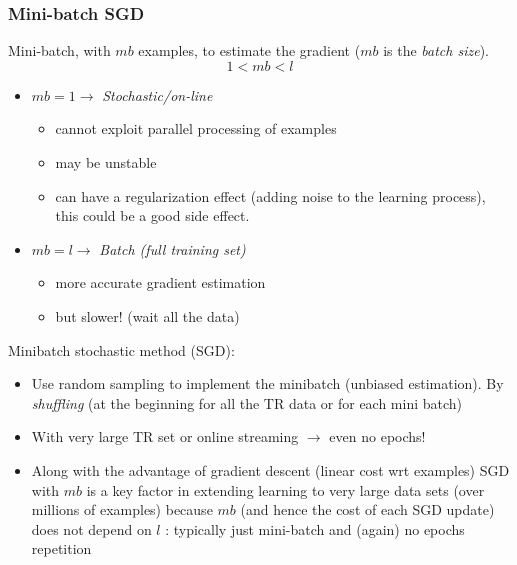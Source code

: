 \documentclass[../main.tex]{subfiles}
\begin{document}
\subsubsection{Mini-batch SGD}
Mini-batch, with $mb$ examples, to estimate the gradient ($mb$ is the \emph{batch size}).
$$1 < mb < l$$
\begin{itemize}
    \item $mb = 1 \rightarrow$ \emph{Stochastic/on-line}
    \begin{itemize}
        \item cannot exploit parallel processing of examples
        \item may be unstable
        \item can have a regularization effect (adding noise to the learning process), this could be a good side effect.
    \end{itemize}
    \item $mb = l \rightarrow$ \emph{Batch (full training set)}
    \begin{itemize}
        \item more accurate gradient estimation
        \item but slower! (wait all the data)
    \end{itemize}
\end{itemize}
Minibatch stochastic method (SGD):
\begin{itemize}
    \item Use random sampling to implement the minibatch (unbiased estimation). By \emph{shuffling} (at the beginning for all the TR data or for each mini batch)
    
    \item With very large TR set or online streaming $\rightarrow$ even no epochs!
    
    
    \item Along with the advantage of gradient descent (linear cost wrt examples) SGD with $mb$ is a key factor in extending learning to very large data sets (over millions of examples) because $mb$ (and hence the cost of each SGD update) does not depend on $l$ : typically just mini-batch and (again) no epochs repetition
\end{itemize}

\newpage
\end{document}
